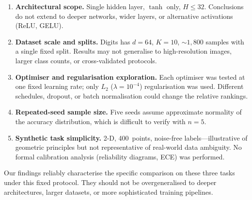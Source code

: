 \documentclass[11pt]{article}
\begin{document}
\begin{enumerate}[leftmargin=2em,itemsep=0.2em]
  \item \textbf{Architectural scope.}
        Single hidden layer, $\tanh$ only, $H\leq 32$.  Conclusions do not extend to
        deeper networks, wider layers, or alternative activations (ReLU, GELU).

  \item \textbf{Dataset scale and splits.}
        Digits has $d{=}64$, $K{=}10$, ${\sim}1{,}800$ samples with a single fixed split.
        Results may not generalise to high-resolution images, larger class counts, or
        cross-validated protocols.

  \item \textbf{Optimiser and regularisation exploration.}
        Each optimiser was tested at one fixed learning rate; only $L_2$
        ($\lambda{=}10^{-4}$) regularisation was used.  Different schedules, dropout,
        or batch normalisation could change the relative rankings.

  \item \textbf{Repeated-seed sample size.}
        Five seeds assume approximate normality of the accuracy distribution, which
        is difficult to verify with $n{=}5$.

  \item \textbf{Synthetic task simplicity.}
        2-D, 400~points, noise-free labels---illustrative of geometric principles but
        not representative of real-world data ambiguity.  No formal calibration
        analysis (reliability diagrams, ECE) was performed.
\end{enumerate}

Our findings reliably characterise the specific comparison on these three tasks under
this fixed protocol.  They should not be overgeneralised to deeper architectures, larger
datasets, or more sophisticated training pipelines.


\newpage
\end{document}
